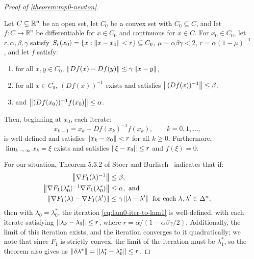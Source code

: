 \documentclass[eikonal.tex]{subfiles}
\begin{document}
\begin{proof}[Proof of \cref{theorem:mp0-newton}]

  \begin{theorem}
    Let $C \subseteq \mathbb{R}^n$ be an open set, let $C_0$ be a convex set
    with $\overline{C}_0 \subseteq C$, and let $f : C \to \mathbb{R}^n$
    be differentiable for $x \in C_0$ and continuous for $x \in C$. For
    $x_0 \in C_0$, let $r, \alpha, \beta, \gamma$ satisfy
    $S_r(x_0) = \left\{x : \left\|x - x_0\right\| < r\right\} \subseteq C_0$,
    $\mu = \alpha\beta\gamma < 2$, $r = \alpha(1 - \mu)^{-1}$, and let
    $f$ satisfy:
    \begin{enumerate}[label=(\alph*)]
    \item for all $x, y \in C_0$,
      $\left\|D f(x) - D f(y)\right\| \leq \gamma \left\|x - y\right\|$,
    \item for all $x \in C_0$, $(D f(x))^{-1}$ exists and satisfies
      $\left\|(Df(x))^{-1}\right\| \leq \beta$,
    \item and $\left\|(Df(x_0))^{-1} f(x_0)\right\| \leq \alpha$.
    \end{enumerate}
    Then, beginning at $x_0$, each iterate:
    \begin{equation}
      x_{k+1} = x_k - Df(x_k)^{-1} f(x_k), \qquad k = 0, 1, \hdots,
    \end{equation}
    is well-defined and satisfies $\left\|x_k - x_0\right\| < r$ for all
    $k \geq 0$. Furthermore, $\lim_{k \to \infty} x_k = \xi$ exists and
    satisfies $\left\|\xi - x_0\right\| \leq r$ and $f(\xi) = 0$.
  \end{theorem}

  For our situation, Theorem 5.3.2 of Stoer and
  Burlisch~\cite{stoer2013introduction} indicates that if:
  \begin{align}
    \norm{\nabla F_1(\lambda)^{-1}} &\leq \beta,\label{item:sb-newton-1} \\
    \norm{\nabla F_1(\lambda_0^*)^{-1} \nabla F_1(\lambda_0^*)} &\leq \alpha,\label{item:sb-newton-2} \mbox{ and} \\
    \norm{\nabla F_1(\lambda) - \nabla F_1(\lambda')} &\leq \gamma \norm{\lambda - \lambda'} \mbox{ for each } \lambda, \lambda' \in \Delta^n,\label{item:sb-newton-3}
  \end{align}
  then with $\lambda_0 = \lambda_0^*$, the iteration
  \cref{eq:lam0-iter-to-lam1} is well-defined, with each iterate
  satisfying $\left\|\lambda_k - \lambda_0\right\| \leq r$, where
  $r = \alpha/(1 - \alpha\beta\gamma/2)$. Additionally, the limit of
  this iteration exists, and the iteration converges to it
  quadratically; we note that since $F_1$ is strictly convex, the
  limit of the iteration must be $\lambda_1^*$, so the theorem also
  gives us
  $\left\|\delta\lambda^*\right\| = \left\|\lambda_1^* - \lambda_0^*\right\| \leq r$.


\end{proof}
\end{document}
